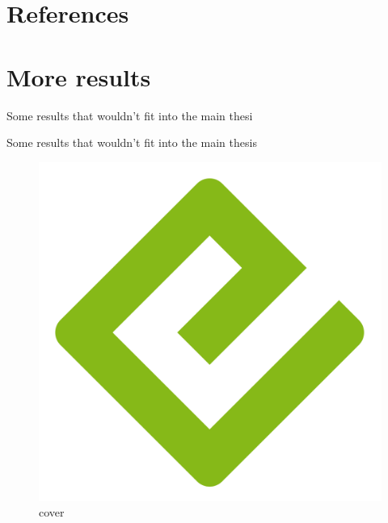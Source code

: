 \documentclass[
  a4paper,
]{scrbook}
\newlength{\cslhangindent}
\newlength{\cslentryspacingunit} %
\newenvironment{CSLReferences}[2] %
 {%
  \setlength{\parindent}{0pt}
  \ifodd #1
  \let\oldpar\par
  \def\par{\hangindent=\cslhangindent\oldpar}
  \fi
  \setlength{\parskip}{#2\cslentryspacingunit}
 }%
 {}
\begin{document}

\hypertarget{references}{%
\chapter*{References}\label{references}}

\hypertarget{refs}{}
\begin{CSLReferences}{0}{0}
\end{CSLReferences}

\appendix
{}

\hypertarget{sec-more-results}{%
\chapter{More results}\label{sec-more-results}}

Some results that wouldn't fit into the main thesi

Some results that wouldn't fit into the main thesis

\begin{figure}

{\centering \includegraphics{./cover.png}

}

\caption{cover}

\end{figure}


\backmatter
\end{document}
